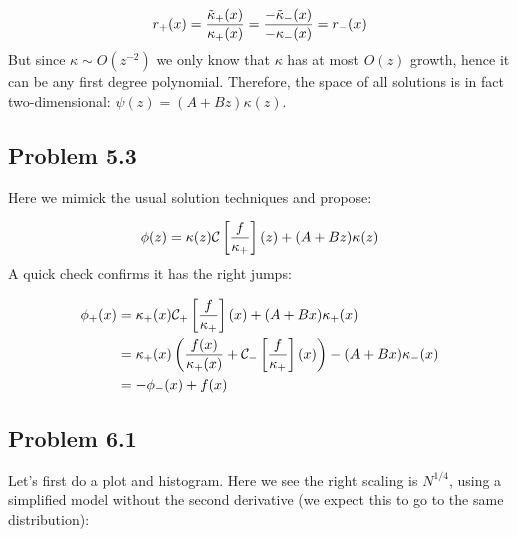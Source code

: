 \documentclass[12pt,a4paper]{article}
\def\CC{ {\cal C} }
\def\br[#1]{\left[{#1}\right]}
\begin{document}
\[
r_+(x) = {\tilde \kappa_+(x) \over \kappa_+(x) }  = {-\tilde \kappa_-(x) \over -\kappa_-(x) }  = r_-(x)
\]
But since $\kappa \sim O(z^{-2})$ we only know that $\kappa$ has at most $O(z)$ growth, hence it can be any first degree polynomial.  Therefore, the space of all solutions is in fact two-dimensional: $\psi(z) = (A + Bz) \kappa(z)$.

\subsection{Problem 5.3}
Here we mimick the usual solution techniques and propose:

\[
\phi(z) = \kappa(z) \CC\br[{f \over \kappa_+}](z) + (A+Bz) \kappa(z)
\]
A quick check confirms it has the right jumps:


\begin{align*}
\phi_+(x) &= \kappa_+(x) \CC_+\br[{f \over \kappa_+}](x) + (A+Bx) \kappa_+(x)\\
& =\kappa_+(x) \left({f(x) \over \kappa_+(x)} + \CC_-\br[{f \over \kappa_+}](x)\right) - (A+Bx) \kappa_-(x)\\
& = -\phi_-(x) + f(x)
\end{align*}
\subsection{Problem 6.1}
Let's first do a plot and histogram. Here we see the right scaling is $N^{1/4}$, using a simplified model without the second derivative (we expect this to go to the same distribution):
\end{document}

